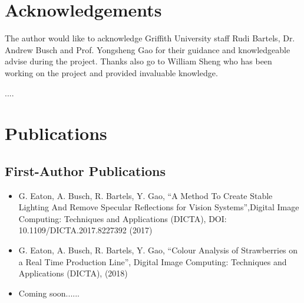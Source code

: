 \documentclass[fleqn,twoside]{article}
\begin{document}
\section*{Acknowledgements}


The author would like to acknowledge Griffith University staff Rudi Bartels, Dr. Andrew Busch and Prof. Yongsheng Gao for their guidance and knowledgeable advise during the project. Thanks also go to William Sheng who has been working on the project and provided invaluable knowledge.

....

\vspace*{\fill}%



\newpage

\section*{Publications}


\subsection{First-Author Publications}

\begin{itemize}
	\item{G. Eaton, A. Busch, R. Bartels, Y. Gao, “A Method To Create Stable Lighting And Remove Specular Reflections for Vision Systems”,Digital Image Computing: Techniques and Applications (DICTA), DOI: 10.1109/DICTA.2017.8227392 (2017)}
	\item{G. Eaton, A. Busch, R. Bartels, Y. Gao, “Colour Analysis of Strawberries on a Real Time Production Line”, Digital Image Computing: Techniques and Applications (DICTA), (2018)}
	\item{Coming soon......}
\end{itemize}  



\vspace*{\fill}%
\end{document}
